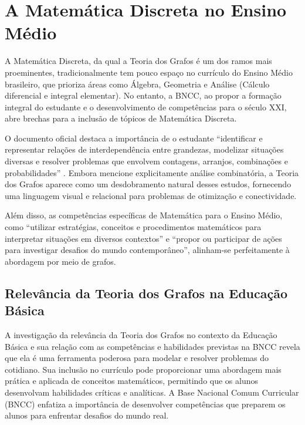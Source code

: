 \documentclass[
  12pt,
  oneside,
  a4paper,
  english,
  brazilian
  ]{abntex2}
\theoremstyle{definition}
\begin{document}
\section{A Matemática Discreta no Ensino Médio}

A Matemática Discreta, da qual a Teoria dos Grafos é um dos ramos mais
proeminentes, tradicionalmente tem pouco espaço no currículo do Ensino Médio
brasileiro, que prioriza áreas como Álgebra, Geometria e Análise (Cálculo
diferencial e integral elementar). No entanto, a BNCC, ao propor a formação
integral do estudante e o desenvolvimento de competências para o século XXI,
abre brechas para a inclusão de tópicos de Matemática Discreta.

O documento oficial destaca a importância de o estudante ``identificar e
representar relações de interdependência entre grandezas, modelizar situações
diversas e resolver problemas que envolvem contagens, arranjos, combinações e
probabilidades'' \cite{brasil2018}. Embora mencione explicitamente análise
combinatória, a Teoria dos Grafos aparece como um desdobramento natural desses
estudos, fornecendo uma linguagem visual e relacional para problemas de
otimização e conectividade.

Além disso, as competências específicas de Matemática para o Ensino Médio, como
``utilizar estratégias, conceitos e procedimentos matemáticos para interpretar
situações em diversos contextos'' e ``propor ou participar de ações para
investigar desafios do mundo contemporâneo'', alinham-se perfeitamente à
abordagem por meio de grafos.

\subsection{Relevância da Teoria dos Grafos na Educação Básica}

A investigação da relevância da Teoria dos Grafos no contexto da Educação Básica e sua relação com as competências e habilidades previstas na BNCC revela que ela é uma ferramenta poderosa para modelar e resolver problemas do cotidiano. Sua inclusão no currículo pode proporcionar uma abordagem mais prática e aplicada de conceitos matemáticos, permitindo que os alunos desenvolvam habilidades críticas e analíticas. A Base Nacional Comum Curricular (BNCC) \cite{brasil2018} enfatiza a importância de desenvolver competências que preparem os alunos para enfrentar desafios do mundo real.
\end{document}
